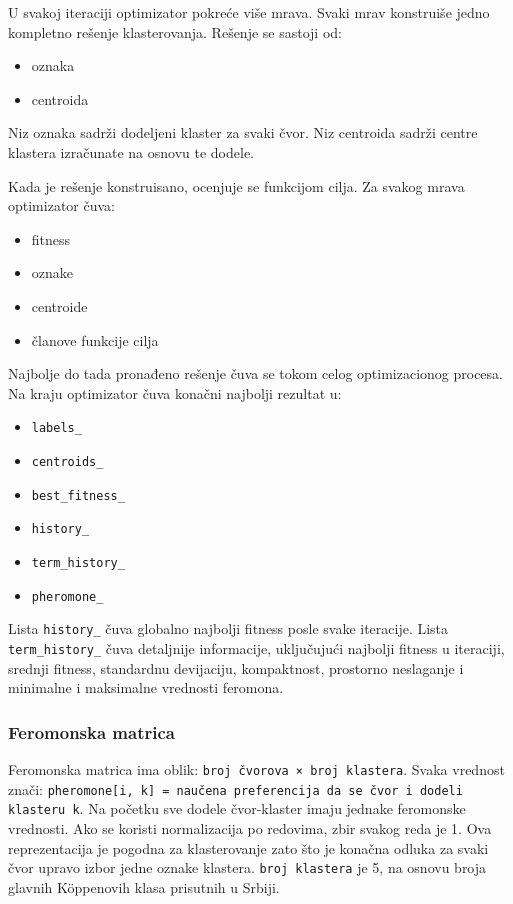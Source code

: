 \documentclass[11pt]{article}
\begin{document}
U svakoj iteraciji optimizator pokreće više mrava. Svaki mrav konstruiše jedno kompletno rešenje klasterovanja. Rešenje se sastoji od:
\begin{itemize}
  \item oznaka
  \item centroida
\end{itemize}
Niz oznaka sadrži dodeljeni klaster za svaki čvor. Niz centroida sadrži centre klastera izračunate na osnovu te dodele.

Kada je rešenje konstruisano, ocenjuje se funkcijom cilja. Za svakog mrava optimizator čuva:
\begin{itemize}
  \item fitness
  \item oznake
  \item centroide
  \item članove funkcije cilja
\end{itemize}

Najbolje do tada pronađeno rešenje čuva se tokom celog optimizacionog procesa. Na kraju optimizator čuva konačni najbolji rezultat u:
\begin{itemize}
  \item \texttt{labels\_}
  \item \texttt{centroids\_}
  \item \texttt{best\_fitness\_}
  \item \texttt{history\_}
  \item \texttt{term\_history\_}
  \item \texttt{pheromone\_}
\end{itemize}

Lista \texttt{history\_} čuva globalno najbolji fitness posle svake iteracije. Lista \texttt{term\_history\_} čuva detaljnije informacije, uključujući najbolji fitness u iteraciji, srednji fitness, standardnu devijaciju, kompaktnost, prostorno neslaganje i minimalne i maksimalne vrednosti feromona.

\subsubsection{Feromonska matrica}
Feromonska matrica ima oblik:
\texttt{broj čvorova × broj klastera}.
Svaka vrednost znači:
\texttt{pheromone[i, k] = naučena preferencija da se čvor i dodeli klasteru k}.
Na početku sve dodele čvor-klaster imaju jednake feromonske vrednosti. Ako se koristi normalizacija po redovima, zbir svakog reda je 1. Ova reprezentacija je pogodna za klasterovanje zato što je konačna odluka za svaki čvor upravo izbor jedne oznake klastera. \texttt{broj klastera} je 5, na osnovu broja glavnih Köppenovih klasa prisutnih u Srbiji.
\end{document}
